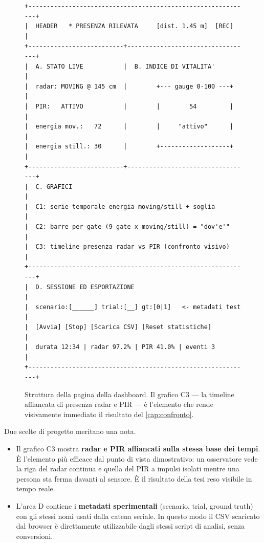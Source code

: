 \begin{figure}[htbp]
\centering
\begin{minipage}{0.95\textwidth}
\ttfamily\scriptsize
\begin{verbatim}
+-------------------------------------------------------------+
|  HEADER   * PRESENZA RILEVATA     [dist. 1.45 m]  [REC]     |
+--------------------------+----------------------------------+
|  A. STATO LIVE           |  B. INDICE DI VITALITA'          |
|  radar: MOVING @ 145 cm  |        +--- gauge 0-100 ---+     |
|  PIR:   ATTIVO           |        |        54         |     |
|  energia mov.:   72      |        |     "attivo"      |     |
|  energia still.: 30      |        +-------------------+     |
+--------------------------+----------------------------------+
|  C. GRAFICI                                                 |
|  C1: serie temporale energia moving/still + soglia           |
|  C2: barre per-gate (9 gate x moving/still) = "dov'e'"       |
|  C3: timeline presenza radar vs PIR (confronto visivo)       |
+-------------------------------------------------------------+
|  D. SESSIONE ED ESPORTAZIONE                                 |
|  scenario:[______] trial:[__] gt:[0|1]   <- metadati test    |
|  [Avvia] [Stop] [Scarica CSV] [Reset statistiche]            |
|  durata 12:34 | radar 97.2% | PIR 41.0% | eventi 3           |
+-------------------------------------------------------------+
\end{verbatim}
\end{minipage}
\caption{Struttura della pagina della dashboard. Il grafico C3 --- la timeline
affiancata di presenza radar e PIR --- è l'elemento che rende visivamente immediato
il risultato del \cref{cap:confronto}.}
\label{fig:webui-layout}
\end{figure}

Due scelte di progetto meritano una nota.

\begin{itemize}[leftmargin=1.4em,itemsep=3pt]
  \item Il grafico C3 mostra \textbf{radar e PIR affiancati sulla stessa base dei
        tempi}. È l'elemento più efficace dal punto di vista dimostrativo: un
        osservatore vede la riga del radar continua e quella del PIR a impulsi
        isolati mentre una persona sta ferma davanti al sensore. È il risultato
        della tesi reso visibile in tempo reale.
  \item L'area D contiene i \textbf{metadati sperimentali} (scenario, trial, ground
        truth) con gli stessi nomi usati dalla catena seriale. In questo modo il CSV
        scaricato dal browser è direttamente utilizzabile dagli stessi script di
        analisi, senza conversioni.
\end{itemize}

